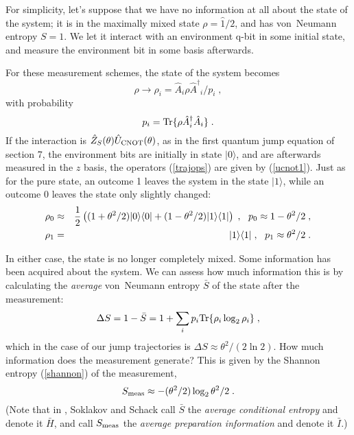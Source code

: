 \documentclass[12pt]{article}
\def\bra#1{{\langle #1 |}}
\def\ket#1{{| #1 \rangle}}
\def\id{{\hat 1}}
\def\tr{{\rm Tr}}
\def\U{{\hat U}}
\def\A{{\hat A}}
\def\Adag{{\hat A^\dagger}}
\def\Z{{\hat Z}}
\begin{document}
For simplicity, let's suppose that we have no information at all about
the state of the system; it is in the maximally mixed state
$\rho = \id/2$, and has von~Neumann entropy $S=1$.
We let it interact with an environment q-bit in some initial state,
and measure the environment bit in some basis afterwards.

For these measurement schemes, the state of the system becomes
\begin{equation}
\rho \rightarrow \rho_i = \A_i \rho \Adag_i / p_i \;,
\label{trajops}
\end{equation}
with probability
\begin{equation}
p_i = \tr\{\rho\Adag_i\A_i\} \;.
\end{equation}
If the interaction is $\Z_S(\theta)\U_{\rm CNOT}(\theta)$, as in the
first quantum jump equation of section 7, the environment bits are
initially in state $\ket0$, and are afterwards measured in the $z$ basis,
the operators (\ref{trajops}) are given by (\ref{ucnot1}).  Just as
for the pure state, an outcome 1 leaves the system in the state $\ket1$,
while an outcome 0 leaves the state only slightly changed:
\begin{eqnarray}
\rho_0 &\approx& {1\over2}\left( (1+\theta^2/2) \ket0\bra0
  + (1-\theta^2/2) \ket1\bra1 \right) \;,\ \ 
  p_0 \approx 1 - \theta^2/2 \;, \nonumber\\
\rho_1 &=& \ket1\bra1 \;, \ \ p_1 \approx \theta^2/2 \;.
\end{eqnarray}

In either case, the state is no longer completely mixed.  Some information
has been acquired about the system.  We can assess how much information
this is by calculating the {\it average} von~Neumann entropy ${\bar S}$
of the state after the measurement:
\begin{equation}
\Delta S = 1 - {\bar S} = 1 + \sum_i p_i \tr\{ \rho_i \log_2 \rho_i \} \;,
\label{deltas}
\end{equation}
which in the case of our jump trajectories is
$\Delta S \approx \theta^2/(2\ln2)$.
How much information does the measurement generate?
This is given by the Shannon entropy (\ref{shannon})
of the measurement,
\begin{equation}
S_{\rm meas} \approx - (\theta^2/2) \log_2\theta^2/2 \;.
\end{equation}
(Note that in \cite{Soklakov}, Soklakov and Schack call ${\bar S}$
the {\it average conditional entropy} and denote it ${\bar H}$,
and call $S_{\rm meas}$ the {\it average preparation information}
and denote it ${\bar I}$.)
\end{document}
